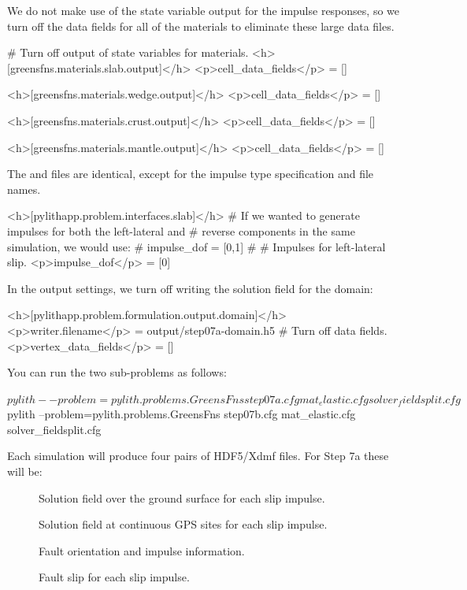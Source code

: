 We do not make use of the state variable output for the impulse
responses, so we turn off the data fields for all of the
materials to eliminate these large data files.
\begin{cfg}
# Turn off output of state variables for materials.
<h>[greensfns.materials.slab.output]</h>
<p>cell_data_fields</p> = []

<h>[greensfns.materials.wedge.output]</h>
<p>cell_data_fields</p> = []

<h>[greensfns.materials.crust.output]</h>
<p>cell_data_fields</p> = []

<h>[greensfns.materials.mantle.output]</h>
<p>cell_data_fields</p> = []
\end{cfg}

The  and  files are
identical, except for the impulse type specification and file
names.
\begin{cfg}
<h>[pylithapp.problem.interfaces.slab]</h>
# If we wanted to generate impulses for both the left-lateral and
# reverse components in the same simulation, we would use:
# impulse_dof = [0,1]
#
# Impulses for left-lateral slip.
<p>impulse_dof</p> = [0]
\end{cfg}

In the output settings, we turn off writing the solution field for the
domain:
\begin{cfg}
<h>[pylithapp.problem.formulation.output.domain]</h>
<p>writer.filename</p> = output/step07a-domain.h5
# Turn off data fields.
<p>vertex_data_fields</p> = []
\end{cfg}

You can run the two sub-problems as follows:
\begin{shell}
$ pylith --problem=pylith.problems.GreensFns step07a.cfg mat_elastic.cfg solver_fieldsplit.cfg
$ pylith --problem=pylith.problems.GreensFns step07b.cfg mat_elastic.cfg solver_fieldsplit.cfg
\end{shell}
Each simulation will produce four pairs of HDF5/Xdmf files. For Step
7a these will be:
\begin{description}
\item[] Solution field over the
  ground surface for each slip impulse.
\item[] Solution field at
  continuous GPS sites for each slip impulse.
\item[] Fault orientation
  and impulse information.
\item[] Fault slip for each slip
  impulse.
\end{description}

